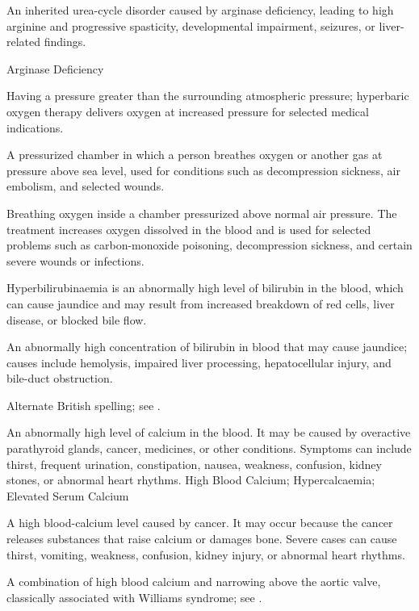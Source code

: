  An inherited urea-cycle disorder caused by arginase deficiency, leading to high arginine and progressive spasticity, developmental impairment, seizures, or liver-related findings.

\synonyms
Arginase Deficiency

 Having a pressure greater than the surrounding atmospheric pressure; hyperbaric oxygen therapy delivers oxygen at increased pressure for selected medical indications.

 A pressurized chamber in which a person breathes oxygen or another gas at pressure above sea level, used for conditions such as decompression sickness, air embolism, and selected wounds.

 Breathing oxygen inside a chamber pressurized above normal air pressure. The treatment increases oxygen dissolved in the blood and is used for selected problems such as carbon-monoxide poisoning, decompression sickness, and certain severe wounds or infections.

 Hyperbilirubinaemia is an abnormally high level of bilirubin in the blood, which can cause jaundice and may result from increased breakdown of red cells, liver disease, or blocked bile flow.

 An abnormally high concentration of bilirubin in blood that may cause jaundice; causes include hemolysis, impaired liver processing, hepatocellular injury, and bile-duct obstruction.

 Alternate British spelling; see .

 An abnormally high level of calcium in the blood. It may be caused by overactive parathyroid glands, cancer, medicines, or other conditions. Symptoms can include thirst, frequent urination, constipation, nausea, weakness, confusion, kidney stones, or abnormal heart rhythms.
\synonyms
High Blood Calcium; Hypercalcaemia; Elevated Serum Calcium

 A high blood-calcium level caused by cancer. It may occur because the cancer releases substances that raise calcium or damages bone. Severe cases can cause thirst, vomiting, weakness, confusion, kidney injury, or abnormal heart rhythms.

 A combination of high blood calcium and narrowing above the aortic valve, classically associated with Williams syndrome; see .

